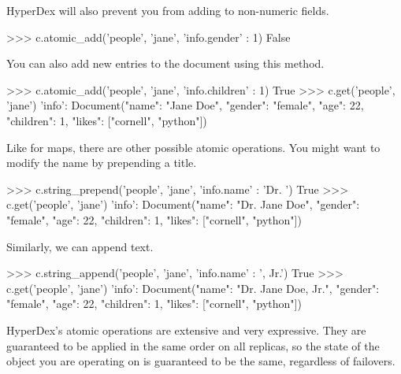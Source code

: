 HyperDex will also prevent you from adding to non-numeric fields.

\begin{pythoncode}
>>> c.atomic_add('people', 'jane', {'info.gender' : 1})
False
\end{pythoncode}

You can also add new entries to the document using this method.

\begin{pythoncode}
>>> c.atomic_add('people', 'jane', {'info.children' : 1})
True
>>> c.get('people', 'jane')
{'info': Document({"name": "Jane Doe", "gender": "female", "age": 22, "children": 1, "likes": ["cornell", "python"]})}
\end{pythoncode}

Like for maps, there are other possible atomic operations. You might want to modify the name by prepending a title.

\begin{pythoncode}
>>> c.string_prepend('people', 'jane', {'info.name' : 'Dr. '})
True
>>> c.get('people', 'jane')
{'info': Document({"name": "Dr. Jane Doe", "gender": "female", "age": 22, "children": 1, "likes": ["cornell", "python"]})}
\end{pythoncode}

Similarly, we can append text. 

\begin{pythoncode}
>>> c.string_append('people', 'jane', {'info.name' : ', Jr.'})
True
>>> c.get('people', 'jane')
{'info': Document({"name": "Dr. Jane Doe, Jr.", "gender": "female", "age": 22, "children": 1, "likes": ["cornell", "python"]})}
\end{pythoncode}



HyperDex's atomic operations are extensive and very expressive.  They are
guaranteed to be applied in the same order on all replicas, so the state of the
object you are operating on is guaranteed to be the same, regardless of
failovers.
